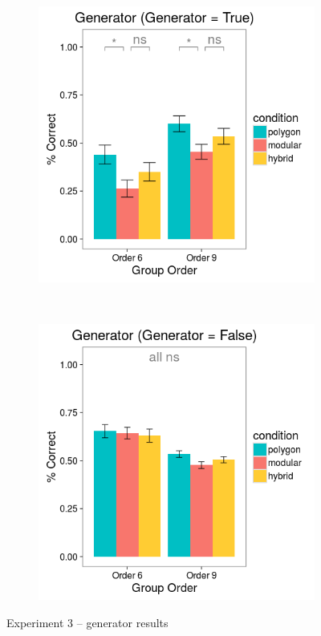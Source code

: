 \documentclass[man,mask,10pt]{apa6}
\begin{document}
\begin{figure}[H]
\centering
\begin{subfigure}[c]{0.3\textwidth}
\centering
\includegraphics[width=\textwidth]{figures/3/gen_T_r.png}
\end{subfigure}
~
\begin{subfigure}[c]{0.3\textwidth}
\centering
\includegraphics[width=\textwidth]{figures/3/gen_F_r.png}
\end{subfigure}
\caption{Experiment 3 -- generator results}
\label{ex3_gen}
\end{figure}\noindent 
\end{document}
